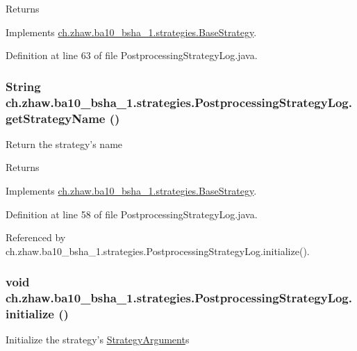 \begin{DoxyReturn}{Returns}

\end{DoxyReturn}


Implements \hyperlink{classch_1_1zhaw_1_1ba10__bsha__1_1_1strategies_1_1BaseStrategy_a75fdb36932ad701f6375cc1fe718056b}{ch.zhaw.ba10\_\-bsha\_\-1.strategies.BaseStrategy}.

Definition at line 63 of file PostprocessingStrategyLog.java.\hypertarget{classch_1_1zhaw_1_1ba10__bsha__1_1_1strategies_1_1PostprocessingStrategyLog_a8ec219607a862bcff3c4290f020d4575}{
\subsubsection[{getStrategyName}]{\setlength{\rightskip}{0pt plus 5cm}String ch.zhaw.ba10\_\-bsha\_\-1.strategies.PostprocessingStrategyLog.getStrategyName ()}}
\label{classch_1_1zhaw_1_1ba10__bsha__1_1_1strategies_1_1PostprocessingStrategyLog_a8ec219607a862bcff3c4290f020d4575}
Return the strategy's name

\begin{DoxyReturn}{Returns}

\end{DoxyReturn}


Implements \hyperlink{classch_1_1zhaw_1_1ba10__bsha__1_1_1strategies_1_1BaseStrategy_aa0ebed55eed45409bad13d43a0058780}{ch.zhaw.ba10\_\-bsha\_\-1.strategies.BaseStrategy}.

Definition at line 58 of file PostprocessingStrategyLog.java.

Referenced by ch.zhaw.ba10\_\-bsha\_\-1.strategies.PostprocessingStrategyLog.initialize().\hypertarget{classch_1_1zhaw_1_1ba10__bsha__1_1_1strategies_1_1PostprocessingStrategyLog_af34bf152422d8a8ebc3540f317764e65}{
\subsubsection[{initialize}]{\setlength{\rightskip}{0pt plus 5cm}void ch.zhaw.ba10\_\-bsha\_\-1.strategies.PostprocessingStrategyLog.initialize ()}}
\label{classch_1_1zhaw_1_1ba10__bsha__1_1_1strategies_1_1PostprocessingStrategyLog_af34bf152422d8a8ebc3540f317764e65}
Initialize the strategy's \hyperlink{classch_1_1zhaw_1_1ba10__bsha__1_1_1StrategyArgument}{StrategyArgument}s 

